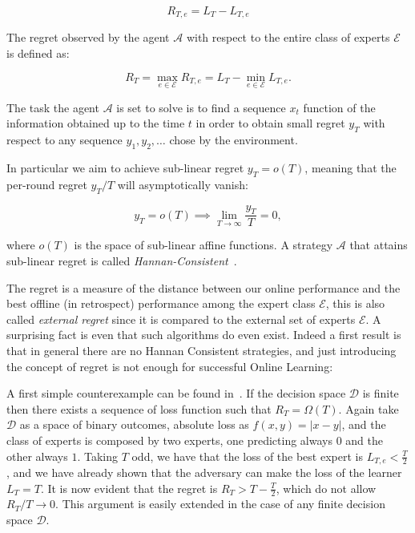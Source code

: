 \begin{equation}\label{def:Regret}
	R_{T,e} = L_T-L_{T,e}
\end{equation}

The regret observed by the agent $\mathcal A$ with respect to the entire class of experts $\mathcal E$ is defined as:

\begin{equation}
	R_T=\max\limits_{e\in\mathcal E}R_{T,e}=L_T-\min\limits_{e\in\mathcal E}L_{T,e}.
\end{equation}

The task the agent $\mathcal A$ is set to solve is to find a sequence $x_t$ function of the information obtained up to the time $t$ in order to obtain small regret $y_T$ with respect to any sequence $y_1,y_2,\ldots$ chose by the environment.

In particular we aim to achieve sub-linear regret $y_T= o(T)$, meaning that the per-round regret $y_T/T$ will asymptotically vanish: 

\begin{equation}
	y_T= o(T) \implies \lim\limits_{T\to \infty}\frac{y_T}{T}=0,
\end{equation}

where $ o(T)$ is the space of sub-linear affine functions. A strategy $\mathcal A$ that attains sub-linear regret is called \emph{Hannan-Consistent}~\cite{hannan1957approximation}.

The regret is a measure of the distance between our online performance and the best offline (in retrospect) performance among the expert class $\mathcal E$, this is also called \emph{external regret} since it is compared to the external set of experts $\mathcal E$. A surprising fact is even that such algorithms do even exist.
Indeed a first result is that in general there are no Hannan Consistent strategies, and just introducing the concept of regret is not enough for successful Online Learning: 

A first simple counterexample can be found in~\cite{cover1966behavior}. If the decision space $\mathcal D$ is finite then there exists a sequence of loss function such that $R_T=\Omega(T)$.
Again take $\mathcal D$ as a space of binary outcomes, absolute loss as $f(x,y)=|x - y|$, and the class of experts is composed by two experts, one predicting always $0$ and the other always $1$. Taking $T$ odd, we have that the loss of the best expert is $L_{T,e}<\frac{T}{2}$, and we have already shown that the adversary can make the loss of the learner $L_T=T$. It is now evident that the regret is $R_T>T-\frac{T}{2}$, which do not allow $R_T/T\to 0$. This argument is easily extended in the case of any finite decision space $\mathcal D$.

